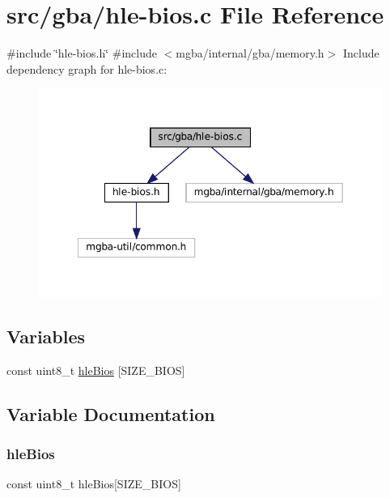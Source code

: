 \hypertarget{hle-bios_8c}{}\section{src/gba/hle-\/bios.c File Reference}
\label{hle-bios_8c}
{\ttfamily \#include \char`\"{}hle-\/bios.\+h\char`\"{}}\newline
{\ttfamily \#include $<$mgba/internal/gba/memory.\+h$>$}\newline
Include dependency graph for hle-\/bios.c\+:
\nopagebreak
\begin{figure}[H]
\begin{center}
\leavevmode
\includegraphics[width=349pt]{hle-bios_8c__incl}
\end{center}
\end{figure}
\subsection*{Variables}
\begin{DoxyCompactItemize}
\item 
const uint8\+\_\+t \mbox{\hyperlink{hle-bios_8c_a9404f7b832200403a103f0d3277c8049}{hle\+Bios}} \mbox{[}S\+I\+Z\+E\+\_\+\+B\+I\+OS\mbox{]}
\end{DoxyCompactItemize}


\subsection{Variable Documentation}
\mbox{\label{hle-bios_8c_a9404f7b832200403a103f0d3277c8049}} 
\subsubsection{\texorpdfstring{hle\+Bios}{hleBios}}
{\footnotesize\ttfamily const uint8\+\_\+t hle\+Bios\mbox{[}S\+I\+Z\+E\+\_\+\+B\+I\+OS\mbox{]}}

